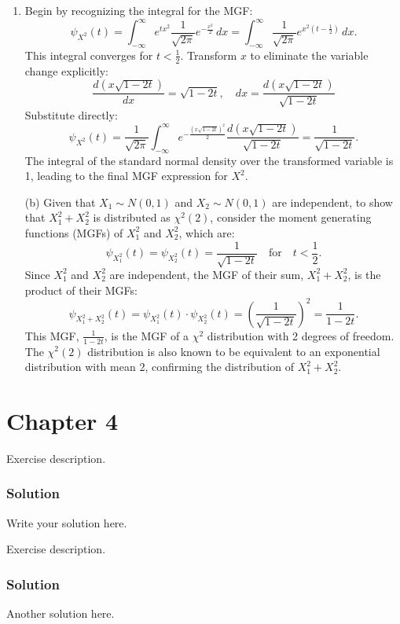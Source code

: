 \documentclass{article}
\begin{document}
\begin{enumerate}[label=(\alph*)]
    \item
    
    Begin by recognizing the integral for the MGF:
    \[
    \psi_{X^2}(t) = \int_{-\infty}^{\infty} e^{tx^2} \frac{1}{\sqrt{2\pi}} e^{-\frac{x^2}{2}} \, dx = \int_{-\infty}^{\infty} \frac{1}{\sqrt{2\pi}} e^{x^2(t - \frac{1}{2})} \, dx.
    \]
    This integral converges for \(t < \frac{1}{2}\). Transform \( x \) to eliminate the variable change explicitly:
    \[
    \frac{d(x\sqrt{1 - 2t})}{dx} = \sqrt{1 - 2t}, \quad dx = \frac{d(x\sqrt{1 - 2t})}{\sqrt{1 - 2t}}
    \]
    Substitute directly:
    \[
    \psi_{X^2}(t) = \frac{1}{\sqrt{2\pi}} \int_{-\infty}^{\infty} e^{-\frac{(x\sqrt{1 - 2t})^2}{2}} \frac{d(x\sqrt{1 - 2t})}{\sqrt{1 - 2t}} = \frac{1}{\sqrt{1 - 2t}}.
    \]
    The integral of the standard normal density over the transformed variable is 1, leading to the final MGF expression for \( X^2 \).
    \item[(b)] Given that \(X_1 \sim N(0, 1)\) and \(X_2 \sim N(0, 1)\) are independent, to show that \(X_1^2 + X_2^2\) is distributed as \(\chi^2(2)\), consider the moment generating functions (MGFs) of \(X_1^2\) and \(X_2^2\), which are:
    \[
    \psi_{X_1^2}(t) = \psi_{X_2^2}(t) = \frac{1}{\sqrt{1 - 2t}} \quad \text{for} \quad t < \frac{1}{2}.
    \]
    Since \(X_1^2\) and \(X_2^2\) are independent, the MGF of their sum, \(X_1^2 + X_2^2\), is the product of their MGFs:
    \[
    \psi_{X_1^2 + X_2^2}(t) = \psi_{X_1^2}(t) \cdot \psi_{X_2^2}(t) = \left(\frac{1}{\sqrt{1 - 2t}}\right)^2 = \frac{1}{1 - 2t}.
    \]
    This MGF, \(\frac{1}{1 - 2t}\), is the MGF of a \(\chi^2\) distribution with 2 degrees of freedom. The \(\chi^2(2)\) distribution is also known to be equivalent to an exponential distribution with mean 2, confirming the distribution of \(X_1^2 + X_2^2\).
\
\end{enumerate}



\section{Chapter 4}

\exercise
Exercise description.
\subsubsection*{Solution}
Write your solution here.

\exercise
Exercise description.
\subsubsection*{Solution}
Another solution here.
\end{document}
